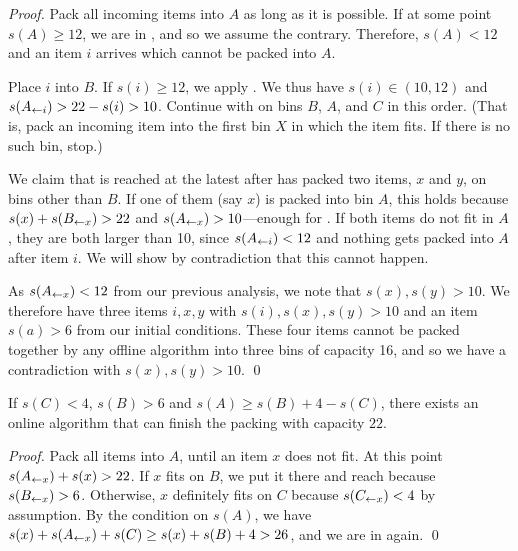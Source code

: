 \begin{proof}
Pack all incoming items into $A$ as long as it is possible. 
If at some point $s(A) \geq 12$, we are in , and so we assume the contrary.
Therefore, $s(A) < 12$ and an item $i$ arrives which cannot be packed into $A$. 

Place $i$ into $B$. If $s(i) \geq 12$, we apply . We thus have
$s(i) \in (10,12)$ and $s(A_{\leftarrow i}) > 22 - s(i) > 10$. Continue with \FF
on bins $B$, $A$, and $C$ in this order. (That is, pack an incoming item into the first bin $X$
in which the item fits. If there is no such bin, stop.)

We claim that  is reached at the latest after \FF has
packed two items, $x$ and $y$, on bins other than $B$. If one of them (say $x$) is
packed into bin $A$, this holds because $s(x) + s(B_{\leftarrow x})>22$
and $s(A_{\leftarrow x})>10$---enough for .
If both items do not fit in $A$, they are both larger than 10, since $s(A_{\leftarrow i})<12$ and nothing gets packed into $A$ after item $i$.
We will show by contradiction that this cannot happen.

As $s(A_{\leftarrow x}) < 12$ from our previous analysis, we note that $s(x), s(y) > 10$.
We therefore have three items $i,x,y$ with $s(i),s(x),s(y)>10$ and
an item $s(a) > 6$ from our initial conditions. These four items
cannot be packed together by any offline algorithm into three bins of
capacity 16, and so we have a contradiction with $s(x), s(y) > 10$.
\qed
\end{proof}

\begin{goodsit}\label{lem:gs6} 
If $s(C)<4$, $s(B)>6$ and $s(A)\ge s(B)+ 4-s(C)$, 
there exists an online algorithm that can finish the packing with capacity $22$.
\end{goodsit}

\begin{proof}
Pack all items into $A$, until an item $x$ does not
fit.  At this point $s(A_{\leftarrow x})+s(x)>22$.  If $x$ fits on $B$, we put it there
and reach  because $s(B_{\leftarrow x})>6$. Otherwise, $x$ definitely fits on $C$
because $s(C_{\leftarrow x})<4$ by assumption.  By the condition on $s(A)$, we have %
$s(x) + s(A_{\leftarrow x})+ s(C) \ge s(x) + s(B)+4>26$, and we are in  again.
\qed
\end{proof}

%


